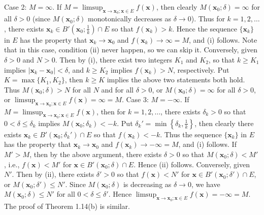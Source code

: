 \documentclass[12pt]{article}
\theoremstyle{definition}
\begin{document}
Case 2: $M=\infty$. If $M=\limsup_{\mathbf{x}\to\mathbf{x}_0; \mathbf{x}\in E}f(\mathbf{x})$, then clearly $M(\mathbf{x}_0;\delta)=\infty$ for all $\delta>0$ (since $M(\mathbf{x}_0;\delta)$ monotonically decreases as $\delta\to 0$). Thus for $k=1,2,\ldots$, there exists $\mathbf{x}_k\in B'\left(\mathbf{x}_0;\frac{1}{k}\right)\cap E$ so that $f(\mathbf{x}_k)>k$. Hence the sequence $\{\mathbf{x}_k\}$ in $E$ has the property that $\mathbf{x}_k\to\mathbf{x}_0$ and $f(\mathbf{x}_k)\to \infty=M$, and (i) follows. Note that in this case, condition (ii) never happen, so we can skip it. Conversely, given $\delta>0$ and $N>0$. Then by (i), there exist two integers $K_1$ and $K_2$, so that $k\ge K_1$ implies $\left\vert\mathbf{x}_k-\mathbf{x}_0\right\vert<\delta$, and $k\ge K_2$ implies $f(\mathbf{x}_k)>N$, respectively. Put $K=\max\{K_1,K_2\}$, then $k\ge K$ implies the above two statements both hold. Thus $M(\mathbf{x}_0;\delta)>N$ for all $N$ and for all $\delta>0$, or $M(\mathbf{x}_0;\delta)=\infty$ for all $\delta>0$, or $\limsup_{\mathbf{x}\to\mathbf{x}_0; \mathbf{x}\in E}f(\mathbf{x})=\infty=M$.
Case 3: $M=-\infty$. If $M=\limsup_{\mathbf{x}\to\mathbf{x}_0; \mathbf{x}\in E}f(\mathbf{x})$, then for $k=1,2,\ldots$, there exists $\delta_k>0$ so that $0<\delta\le\delta_k$ implies $M(\mathbf{x}_0;\delta_k)<-k$. Put $\delta_k'=\min\left\{\delta_k,\frac{1}{k}\right\}$, then clearly there exists $\mathbf{x}_k\in B'(\mathbf{x}_0;\delta_k')\cap E$ so that $f(\mathbf{x}_k)<-k$. Thus the sequence $\{\mathbf{x}_k\}$ in $E$ has the property that $\mathbf{x}_k\to\mathbf{x}_0$ and $f(\mathbf{x}_k)\to -\infty=M$, and (i) follows. If $M'>M$, then by the above argument, there exists $\delta>0$ so that $M(\mathbf{x}_0;\delta)<M'$, i.e., $f(\mathbf{x})<M'$ for $\mathbf{x}\in B'(\mathbf{x}_0;\delta)\cap E$. Hence (ii) follows. Conversely, given $N'$. Then by (ii), there exists $\delta'>0$ so that $f(\mathbf{x})<N'$ for $\mathbf{x}\in B'(\mathbf{x}_0;\delta')\cap E$, or $M(\mathbf{x}_0;\delta')\le N'$. Since $M(\mathbf{x}_0;\delta)$ is decreasing as $\delta\to 0$, we have $M(\mathbf{x}_0;\delta)\le N'$ for all $0<\delta\le\delta'$. Hence $\limsup_{\mathbf{x}\to\mathbf{x}_0; \mathbf{x}\in E}f(\mathbf{x})=-\infty=M$.
The proof of Theorem 1.14(b) is similar.
\end{document}
